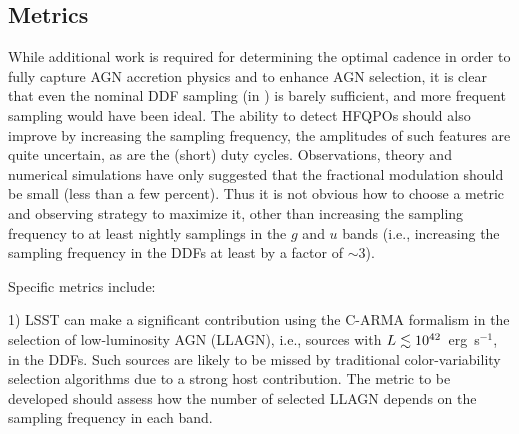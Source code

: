 

\subsection{Metrics}
\label{sec:\secname:metrics}





While additional work is required for determining the optimal cadence in order
to fully capture AGN accretion physics and to enhance AGN selection, it is clear
that even the nominal DDF sampling (\eg in ) is barely sufficient, and
more frequent sampling would have been ideal. The ability to detect HFQPOs
should also improve by increasing the sampling frequency, the amplitudes of such
features are quite uncertain, as are the (short) duty cycles. Observations,
theory and numerical simulations have only suggested that the fractional
modulation should be small (less than a few percent). Thus it is not obvious how
to choose a metric and observing strategy to maximize it, other than increasing
the sampling frequency to at least nightly samplings in the $g$ and $u$ bands
(i.e., increasing the sampling frequency in the DDFs at least by a factor of
$\sim 3$).

Specific metrics include:

1) LSST can make a significant contribution using
the C-ARMA formalism in the selection of low-luminosity AGN (LLAGN), i.e.,
sources with $L \lesssim 10^{42}$~erg~s$^{-1}$, in the DDFs. Such sources are
likely to be missed by traditional color-variability selection algorithms due to
a strong host contribution. The metric to be developed should assess how the
number of selected LLAGN depends on the sampling frequency in each band.

